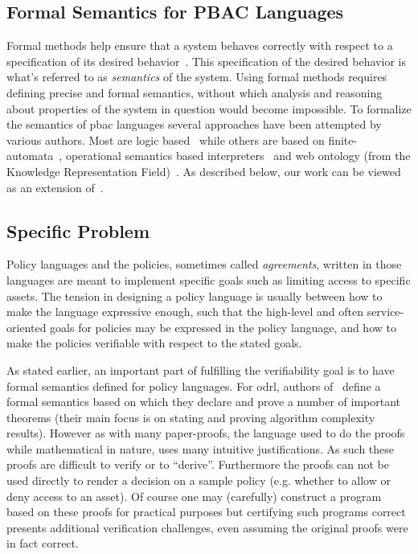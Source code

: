 \documentclass[conference]{IEEEtran}
\begin{document}
\subsection{Formal Semantics for PBAC Languages}


Formal methods help ensure that a system behaves correctly with respect to a specification of its desired behavior~\cite{TAPL}. This specification of the desired behavior is what's referred to as \emph{semantics} of the system. Using formal methods requires defining precise and formal semantics, without which analysis and reasoning about properties of the system in question would become impossible. To formalize the semantics of \ac{pbac} languages several approaches have been attempted by various authors. Most are logic based~\cite{Halpern2008,pucella2006} while others are based on finite-automata~\cite{Holzer}, operational semantics based interpreters~\cite{Safavi-naini} and web ontology (from the Knowledge Representation Field)~\cite{Kasten2010MTS}. 
%
As described below, our work can be viewed as an extension
of~\cite{pucella2006}.


\subsection{Specific Problem}

Policy languages and the policies, sometimes called \emph{agreements}, written in those languages are meant to implement specific goals such as limiting access to specific assets. The tension in designing a policy language is usually between how to make the language expressive enough, such that the high-level and often service-oriented goals for policies may be expressed in the policy language, and how to make the policies verifiable with respect to the stated goals.

As stated earlier, an important part of fulfilling the verifiability goal is to have formal semantics defined for policy languages. For \ac{odrl}, authors of~\cite{pucella2006} define a formal semantics based on which they declare and prove a number of important theorems (their main focus is on stating and proving algorithm complexity results). However as with many paper-proofs, the language used to do the proofs while mathematical in nature, uses many intuitive justifications. As such these proofs are difficult to verify or to ``derive''. Furthermore the proofs can not be used directly to render a decision on a sample policy (e.g. whether to allow or deny access to an asset). Of course one may (carefully) construct a program based on these proofs for practical purposes but certifying such programs correct presents additional verification challenges, even assuming the original proofs were in fact correct.
\end{document}
